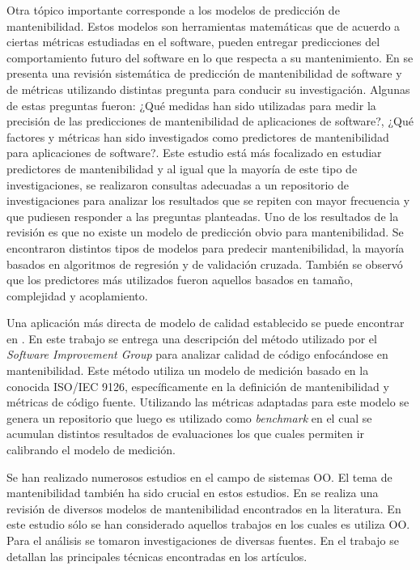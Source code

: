 Otra tópico importante corresponde a los modelos de predicción de mantenibilidad.
Estos modelos son herramientas matemáticas que de acuerdo a ciertas métricas
estudiadas en el software, pueden entregar predicciones del comportamiento futuro
del software en lo que respecta a su mantenimiento.
En \cite{Riaz:2009} se presenta una revisión sistemática de predicción de mantenibilidad
de software y de métricas utilizando distintas pregunta para conducir su investigación.
Algunas de estas preguntas fueron: ¿Qué medidas han sido utilizadas para
medir la precisión de las predicciones de mantenibilidad de aplicaciones de software?,
¿Qué factores y métricas han sido investigados como predictores de mantenibilidad
para aplicaciones de software?. Este estudio está más focalizado en estudiar
predictores de mantenibilidad y al igual que la mayoría de este tipo de investigaciones,
se realizaron consultas adecuadas a un repositorio de investigaciones para
analizar los resultados que se repiten con mayor frecuencia y que pudiesen responder
a las preguntas planteadas.
Uno de los resultados de la revisión es que no existe un modelo de predicción
obvio para mantenibilidad. Se encontraron distintos tipos de modelos para predecir
mantenibilidad, la mayoría basados en algoritmos de regresión y de validación
cruzada. También se observó que los predictores más utilizados fueron aquellos
basados en tamaño, complejidad y acoplamiento.

Una aplicación más directa de modelo de calidad establecido se puede encontrar en
\cite{Baggen:2012}. En este trabajo se entrega una descripción del método utilizado
por el \textit{Software Improvement Group} para analizar calidad de código 
enfocándose en mantenibilidad. Este método utiliza un modelo de medición
basado en la conocida ISO/IEC 9126, específicamente en la definición de mantenibilidad
y métricas de código fuente. Utilizando las métricas adaptadas para este modelo
se genera un repositorio que luego es utilizado como \textit{benchmark} en
el cual se acumulan distintos resultados de evaluaciones los que cuales permiten
ir calibrando el modelo de medición.

Se han realizado numerosos estudios en el campo de sistemas OO. El tema
de mantenibilidad también ha sido crucial en estos estudios. En \cite{Kumar:2011}
se realiza una revisión de diversos modelos de mantenibilidad 
encontrados en la literatura. En este estudio sólo se han considerado
aquellos trabajos en los cuales es utiliza OO. Para el análisis se
tomaron investigaciones de diversas fuentes. En el trabajo se detallan
las principales técnicas encontradas en los artículos.
